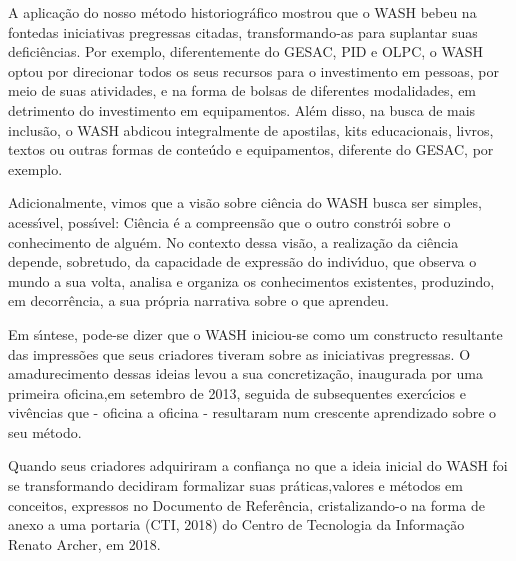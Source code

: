 \documentclass[
12pt,		%
openright,	%
twoside,  %
a4paper,			%
chapter=TITLE,		%
english,			%
french,				%
spanish,			%
brazil				%
]{USPSC-classe/USPSC}
\begin{document}
A aplica\c{c}\~ao do nosso m\'etodo historiogr\'afico mostrou que o WASH \textquotedbl bebeu na fonte\textquotedbl  das iniciativas pregressas citadas, transformando-as para suplantar suas defici\^encias.  Por exemplo, diferentemente do GESAC, PID e OLPC, o WASH optou por direcionar todos os seus recursos para o investimento em pessoas, por meio de suas atividades, e na forma de bolsas de diferentes modalidades, em detrimento do investimento em equipamentos. Al\'em disso, na busca de mais inclus\~ao, o WASH abdicou integralmente de apostilas, kits educacionais, livros, textos ou outras formas de conte\'udo e equipamentos, diferente do GESAC, por exemplo.








Adicionalmente, vimos que a vis\~ao sobre ci\^encia do WASH busca ser  simples, acess\'{\i}vel, poss\'{\i}vel: \textquotedbl Ci\^encia \'e a compreens\~ao que o outro constr\'oi sobre o conhecimento de algu\'em\textquotedbl . No contexto dessa vis\~ao, a realiza\c{c}\~ao da ci\^encia depende, sobretudo, da capacidade de express\~ao do indiv\'{\i}duo, que observa o mundo a sua volta, analisa e organiza os conhecimentos existentes, produzindo, em decorr\^encia, a sua pr\'opria narrativa sobre o que aprendeu.








Em s\'{\i}ntese, pode-se dizer que o WASH iniciou-se como um constructo resultante das impress\~oes que seus criadores tiveram sobre as iniciativas pregressas. O amadurecimento dessas ideias levou a sua concretiza\c{c}\~ao, inaugurada por uma primeira oficina,em setembro de 2013, seguida de subsequentes exerc\'{\i}cios e  viv\^encias que - oficina a oficina - resultaram num crescente aprendizado sobre o seu m\'etodo.








Quando seus criadores adquiriram a confian\c{c}a no que a ideia inicial do WASH foi se transformando decidiram formalizar suas pr\'aticas,valores e m\'etodos em conceitos, expressos  no Documento de Refer\^encia, cristalizando-o na forma de anexo a uma portaria  (CTI, 2018)  do Centro de Tecnologia da Informa\c{c}\~ao Renato Archer, em 2018.
\end{document}
